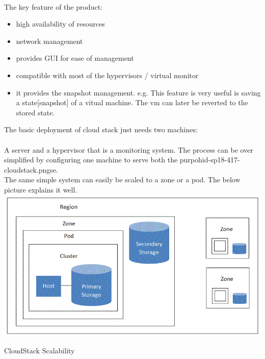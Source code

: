 \\
The key feature of the product:
\begin{itemize}
\item        high availability of resources
\item        network management
\item        provides GUI for ease of management
\item        compatible with most of the hypervisors / virtual monitor
\item        it provides the snapshot management. e.g. This feature is 
very useful is saving a state[snapshot] of a vitual machine. 
The vm can later be reverted to the stored state.  
\end{itemize}
 The basic deployment of cloud stack just needs two machines: \\
 \\
 A server and a hypervisor that is a monitoring system. 
 The process can be over simplified by configuring one machine 
 to serve both the purpohid-sp18-417-cloudstack.pngse. \\
 The same simple system can easily be scaled to a zone or a pod.
 The below picture explains it well.
 \includegraphics[width=\textwidth]{hid-sp18-417-cloudstack}
\begin{center}
CloudStack Scalability ~\cite{hid-sp18-417-cloudstack-scaling} 
\end{center}

